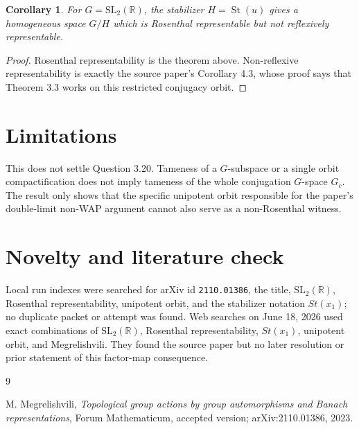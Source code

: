 \documentclass[11pt]{article}
\newtheorem{corollary}{Corollary}
\newcommand{\R}{\mathbb{R}}
\newcommand{\SL}{\mathrm{SL}}
\newcommand{\St}{\operatorname{St}}
\begin{document}
\begin{corollary}
For \(G=\SL_2(\R)\), the stabilizer \(H=\St(u)\) gives a homogeneous
space \(G/H\) which is Rosenthal representable but not reflexively
representable.
\end{corollary}

\begin{proof}
Rosenthal representability is the theorem above.  Non-reflexive
representability is exactly the source paper's Corollary 4.3, whose
proof says that Theorem 3.3 works on this restricted conjugacy orbit.
\end{proof}

\section*{Limitations}

This does not settle Question 3.20.  Tameness of a \(G\)-subspace or a
single orbit compactification does not imply tameness of the whole
conjugation \(G\)-space \(G_c\).  The result only shows that the
specific unipotent orbit responsible for the paper's double-limit
non-WAP argument cannot also serve as a non-Rosenthal witness.

\section*{Novelty and literature check}

Local run indexes were searched for arXiv id \texttt{2110.01386}, the
title, \(\SL_2(\R)\), Rosenthal representability, unipotent orbit, and
the stabilizer notation \(St(x_1)\); no duplicate packet or attempt was
found.  Web searches on June 18, 2026 used exact combinations of
\(\SL_2(\R)\), Rosenthal representability, \(St(x_1)\), unipotent
orbit, and Megrelishvili.  They found the source paper but no later
resolution or prior statement of this factor-map consequence.

\begin{thebibliography}{9}

M. Megrelishvili,
\emph{Topological group actions by group automorphisms and Banach
representations},
Forum Mathematicum, accepted version; arXiv:2110.01386, 2023.

\end{thebibliography}
\end{document}
